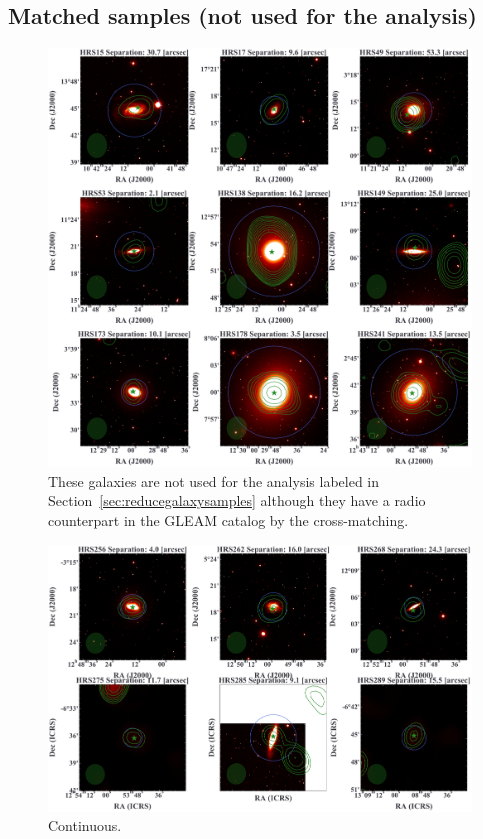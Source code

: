 \documentclass[12pt,a4paper,twoside,openright,final,titlepage]{report}
\begin{document}
\begin{appendices}
\section{Matched samples (not used for the analysis)}
\begin{figure}[htbp]
    \centering
    \includegraphics[width=\linewidth]{Figures/AppendixB_galaxyimages_notselected.pdf}
    \caption[Galaxy images (9/15 not used for the analysis)]{\label{fig:galaxyimages_notselected}
        These galaxies are not used for the analysis labeled in Section~\ref{sec:reducegalaxysamples} although they have a radio counterpart in the GLEAM catalog by the cross-matching.
    }
\end{figure}

\begin{figure}[htbp]
    \centering
    \includegraphics[width=\linewidth]{Figures/AppendixB_galaxyimages_notselected2.pdf}
    \caption[Galaxy images (6/15 not used for the analysis)]{\label{fig:galaxyimages_notselected}
        Continuous.
    }
\end{figure}




\end{appendices}
\end{document}
